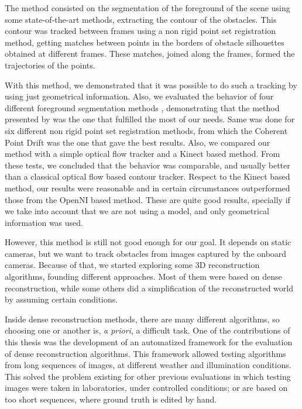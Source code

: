 The method consisted on the segmentation of the foreground of the scene using some state-of-the-art methods, extracting the contour of the obstacles. This contour was tracked between frames using a non rigid point set registration method, getting matches between points in the borders of obstacle silhouettes obtained at different frames. These matches, joined along the frames, formed the trajectories of the points.

With this method, we demonstrated that it was possible to do such a tracking by using just geometrical information. Also, we evaluated the behavior of four different foreground segmentation methods \citep{lopez2011stochastic, lopez2011foreground, guo2011hierarchical, reddy2012improved}, demonstrating that the method presented by \cite{reddy2012improved} was the one that fulfilled the most of our needs. Same was done for six different non rigid point set registration methods, from which the Coherent Point Drift was the one that gave the best results. Also, we compared our method with a simple optical flow tracker and a Kinect based method. From these tests, we concluded that the behavior was comparable, and usually better than a classical optical flow based contour tracker. Respect to the Kinect based method, our results were reasonable and in certain circumstances outperformed those from the OpenNI based method. These are quite good results, specially if we take into account that we are not using a model, and only geometrical information was used.

However, this method is still not good enough for our goal. It depends on static cameras, but we want to track obstacles from images captured by the onboard cameras. Because of that, we started exploring some 3D reconstruction algorithms, founding different approaches. Most of them were based on dense reconstruction, while some others did a simplification of the reconstructed world by assuming certain conditions.

Inside dense reconstruction methods, there are many different algorithms, so choosing one or another is, \emph{a priori}, a difficult task. One of the contributions of this thesis was the development of an automatized framework for the evaluation of dense reconstruction algorithms. This framework allowed testing algorithms from long sequences of images, at different weather and illumination conditions. This solved the problem existing for other previous evaluations in which testing images were taken in laboratories, under controlled conditions; or are based on too short sequences, where ground truth is edited by hand.

